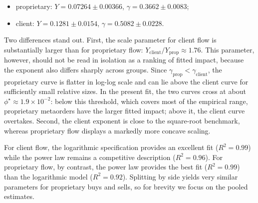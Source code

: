 \documentclass[11pt]{article}
\begin{document}
\begin{itemize}
  \item proprietary: $Y = 0.07264 \pm 0.00366$, $\gamma = 0.3662 \pm 0.0083$;
  \item client: $Y = 0.1281 \pm 0.0154$, $\gamma = 0.5082 \pm 0.0228$.
\end{itemize}
Two differences stand out. First, the scale parameter for client flow is substantially larger than for proprietary 
flow: $Y_{\mathrm{client}}/Y_{\mathrm{prop}} \approx 1.76$. This parameter, however, should not be
read in isolation as a ranking of fitted impact, because the exponent also differs sharply across groups. Since
$\gamma_{\mathrm{prop}} < \gamma_{\mathrm{client}}$, the proprietary curve is flatter in log-log scale and can lie
above the client curve for sufficiently small relative sizes. In the present fit, the two curves cross at about
$\phi^\star \approx 1.9 \times 10^{-2}$: below this threshold, which covers most of the empirical range, proprietary
metaorders have the larger fitted impact; above it, the client curve overtakes. Second, the client exponent is close
to the square-root benchmark, whereas proprietary flow displays a markedly more concave scaling.

For client flow, the logarithmic specification provides an excellent fit  ($R^2 = 0.99$) while the power law remains 
a competitive description ($R^2 = 0.96$). For proprietary flow, by contrast, the power law provides the best fit 
($R^2 = 0.99$) than the logarithmic model ($R^2 = 0.92$). Splitting by side yields very similar parameters for 
proprietary buys and sells, so for brevity we focus on the pooled estimates.


\end{document}
